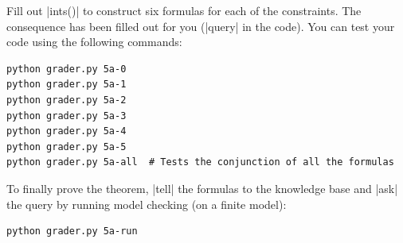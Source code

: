 \item {}
Fill out |ints()| to construct six formulas for each of the constraints.  The
consequence has been filled out for you (|query| in the code). You can test your
code using the following commands:
\begin{lstlisting}
python grader.py 5a-0
python grader.py 5a-1
python grader.py 5a-2
python grader.py 5a-3
python grader.py 5a-4
python grader.py 5a-5
python grader.py 5a-all  # Tests the conjunction of all the formulas
\end{lstlisting}

To finally prove the theorem, |tell| the formulas to the knowledge base and
|ask| the query by running model checking (on a finite model):
\begin{lstlisting}
python grader.py 5a-run
\end{lstlisting}
